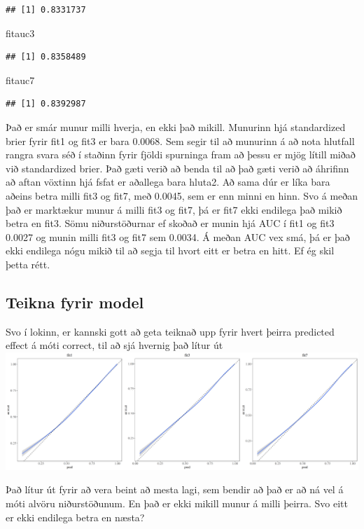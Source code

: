 \documentclass[
]{article}
\newenvironment{Shaded}{\begin{snugshade}}{\end{snugshade}}
\newcommand{\NormalTok}[1]{#1}
\begin{document}
\begin{verbatim}
## [1] 0.8331737
\end{verbatim}

\begin{Shaded}
\begin{Highlighting}[]
\NormalTok{fitauc3}
\end{Highlighting}
\end{Shaded}

\begin{verbatim}
## [1] 0.8358489
\end{verbatim}

\begin{Shaded}
\begin{Highlighting}[]
\NormalTok{fitauc7}
\end{Highlighting}
\end{Shaded}

\begin{verbatim}
## [1] 0.8392987
\end{verbatim}

Það er smár munur milli hverja, en ekki það mikill. Munurinn hjá standardized brier fyrir fit1 og fit3 er bara 0.0068. Sem segir til að munurinn á að nota hlutfall rangra svara séð í staðinn fyrir fjöldi spurninga fram að þessu er mjög lítill miðað við standardized brier. Það gæti verið að benda til að það gæti verið að áhrifinn að aftan vöxtinn hjá fsfat er aðallega bara hluta2.
Að sama dúr er líka bara aðeins betra milli fit3 og fit7, með 0.0045, sem er enn minni en hinn. Svo á meðan það er marktækur munur á milli fit3 og fit7, þá er fit7 ekki endilega það mikið betra en fit3.
Sömu niðurstöðurnar ef skoðað er munin hjá AUC í fit1 og fit3 0.0027 og munin milli fit3 og fit7 sem 0.0034. Á meðan AUC vex smá, þá er það ekki endilega nógu mikið til að segja til hvort eitt er betra en hitt. Ef ég skil þetta rétt.

\hypertarget{teikna-fyrir-model}{%
\subsection{Teikna fyrir model}\label{teikna-fyrir-model}}

Svo í lokinn, er kannski gott að geta teiknað upp fyrir hvert þeirra predicted effect á móti correct, til að sjá hvernig það lítur út
\includegraphics{Img/predplot.png}

Það lítur út fyrir að vera beint að mesta lagi, sem bendir að það er að ná vel á móti alvöru niðurstöðunum. En það er ekki mikill munur á milli þeirra. Svo eitt er ekki endilega betra en næsta?
\end{document}
